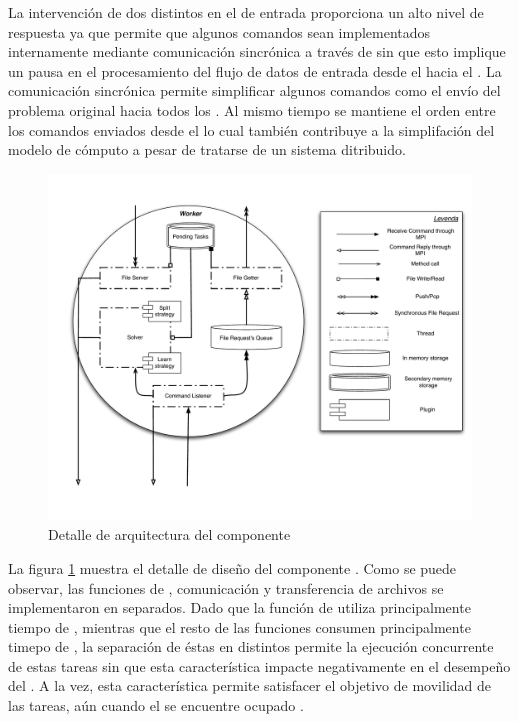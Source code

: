 La intervención de dos \threads distintos en el \datapath de entrada
proporciona un alto nivel de respuesta ya que permite que algunos comandos
sean implementados internamente mediante comunicación sincrónica a través de
\mpi sin que esto implique un pausa en el procesamiento del flujo de datos de
entrada desde el \fend hacia el \bend. La comunicación sincrónica permite
simplificar algunos comandos como el envío del problema original hacia todos
los \ws. Al mismo tiempo se mantiene el orden entre los comandos enviados
desde el \fend lo cual también contribuye a la simplifación del modelo de
cómputo a pesar de tratarse de un sistema ditribuido.

\begin{figure}
\centering
\label{fig:workerdetail}
\includegraphics[scale=0.3]{graphs/worker detail}
\caption{Detalle de arquitectura del componente \w}
\end{figure}

La figura \ref{fig:workerdetail} muestra el detalle de diseño del componente
\w. Como se puede observar, las funciones de \solving, comunicación y
transferencia de archivos se implementaron en \threads separados. Dado que la
función de \solving utiliza principalmente tiempo de \cpu, mientras que el
resto de las funciones consumen principalmente timepo de \io, la separación de
éstas en distintos \threads permite la ejecución concurrente de estas
tareas sin que esta característica impacte negativamente en el desempeño del
\ssolver. A la vez, esta característica permite satisfacer el objetivo de
movilidad de las tareas, aún cuando el \w se encuentre ocupado \solveando.

